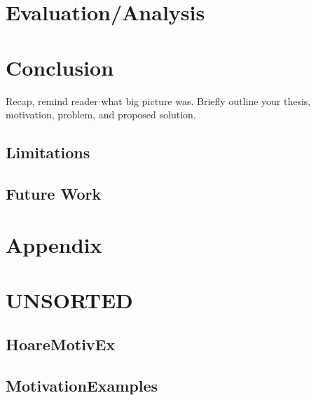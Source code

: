 \chapter{Evaluation/Analysis}



\chapter{Conclusion}
Recap, remind reader what big picture was.
Briefly outline your thesis, motivation, problem, and proposed solution.

\section{Limitations}

\section{Future Work}


\chapter{Appendix}


\chapter{UNSORTED}

\section{HoareMotivEx}
\label{sec:hoaremotivex}


\section{MotivationExamples}
\label{sec:motivationexamples}

